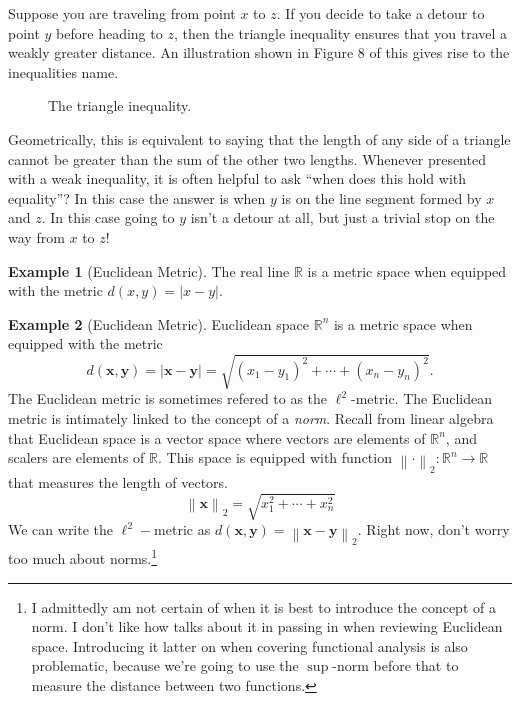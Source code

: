 \documentclass{article}
\newcommand{\R}{\mathbb{R}}
\newcommand{\x}{\mathbf{x}}
\newcommand{\y}{\mathbf{y}}
\newcommand{\norm}[1]{\left\lVert#1\right\rVert}
\theoremstyle{definition}
\newtheorem{example}{Example}[section]
\begin{document}
Suppose you are traveling from point $ x $ to $ z $. If you decide to take a detour to point $ y $ before heading to $ z $, then the triangle inequality ensures that you travel a weakly greater distance. An illustration shown in Figure 8 of this gives rise to the inequalities name.
\begin{figure}[h!]
	\centering
	\caption{The triangle inequality.}
\end{figure}  
Geometrically, this is equivalent to saying that the length of any side of a triangle cannot be greater than the sum of the other two lengths. Whenever presented with a weak inequality, it is often helpful to ask ``when does this hold with equality''? In this case the answer is when $ y $ is on the line segment formed by $ x $ and $ z $. In this case going to $ y $ isn't a detour at all, but just a trivial stop on the way from $ x $ to $ z $! 
\begin{example}[Euclidean Metric]
The real line $ \R $ is a metric space when equipped with the metric $ d(x,y)=|x-y| $. 
\end{example}
\begin{example}[Euclidean Metric]
Euclidean space $ \R^n $ is a metric space when equipped with the metric $$ d(\mathbf{x},\mathbf{y})=|\x-\y|=\sqrt{(x_1-y_1)^2+\cdots+(x_n-y_n)^2} .$$ The Euclidean metric is sometimes refered to as the $ \ell^2 $-metric. The Euclidean metric is intimately linked to the concept of a \textit{\color{red}norm}. Recall from linear algebra that Euclidean space is a vector space where vectors are elements of $ \R^n $, and scalers are elements of $ \R $. This space is equipped with function $ \norm{\cdot}_2:\R^n\to\R $ that measures the length of vectors. $$ \norm{\x}_2=\sqrt{x_1^2+\cdots+x_n^2}$$ We can write the $ \ell^2 -$metric as $ d(\x,\y)=\norm{\x-\y}_2 $. Right now, don't worry too much about norms.\footnote{I admittedly am not certain of when it is best to introduce the concept of a norm. I don't like how \cite{rudin1964principles} talks about it in passing in when reviewing Euclidean space. Introducing it latter on when covering functional analysis is also problematic, because we're going to use the $ \sup $-norm before that to measure the distance between two functions.} 
\end{example}
\end{document}
